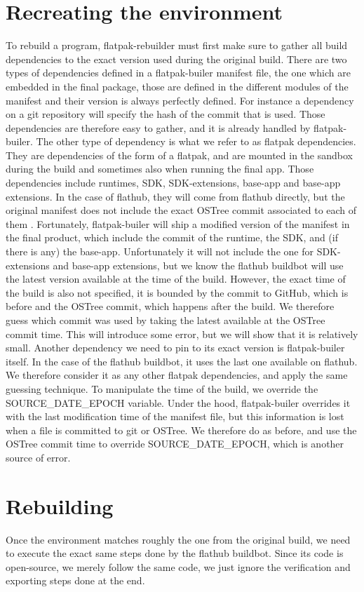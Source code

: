 \documentclass[a4paper,11pt,oneside]{report}
\theoremstyle{definition}
\newcommand{\sysname}{flatpak-rebuilder\xspace}
\newcommand{\fp}{flatpak\xspace}
\newcommand{\fh}{flathub\xspace}
\newcommand{\fb}{flatpak-builer\xspace}
\newcommand{\fdp}{flatpak dependencies\xspace}
\newcommand{\sde}{SOURCE\_DATE\_EPOCH\xspace}
\newcommand{\fhbb}{flathub buildbot\xspace}
\newcommand{\ot}{OSTree\xspace}
\begin{document}
\section{Recreating the environment}
To rebuild a program, \sysname must first make sure to gather all build
dependencies to the exact version used during the original build. There are two
types of dependencies defined in a \fb manifest file, the one which are
embedded in the final package, those are defined in the different modules of
the manifest and their version is always perfectly defined. For instance a
dependency on a git repository will specify the hash of the commit that is
used. Those dependencies are therefore easy to gather, and it is already
handled by \fb.
The other type of dependency is what we refer to as \fdp. They are dependencies
of the form of a \fp, and are mounted in the sandbox during the build and
sometimes also when running the final app. Those dependencies include runtimes,
SDK, SDK-extensions, base-app and base-app extensions. In the case of \fh, they
will come from \fh directly, but the original manifest does not include the
exact \ot commit associated to each of them . Fortunately, \fb will ship a
modified version of the manifest in the final product, which include the commit
of the runtime, the SDK, and (if there is any) the base-app. Unfortunately it
will not include the one for SDK-extensions and base-app extensions, but we
know the \fhbb will use the latest version available at the time of the build.
However, the exact time of the build is also not specified, it is bounded by
the commit to GitHub, which is before and the \ot commit, which happens
after the build. We therefore guess which commit was used by taking the latest
available at the \ot commit time. This will introduce some error, but we
will show that it is relatively small. Another dependency we need to
pin to its exact version is \fb itself. In the case of the \fhbb, it uses the
last one available on \fh. We therefore consider it as any other \fdp, and
apply the same guessing technique. 
To manipulate the time of the build, we override the \sde variable. Under the
hood, \fb overrides it with the last modification time of the manifest file,
but this information is lost when a file is committed to git or \ot . We
therefore do as before, and use the \ot commit time to override \sde, which
is another source of error.

\section{Rebuilding}
Once the environment matches roughly the one from the original build, we need
to execute the exact same steps done by the \fhbb. Since its code is
open-source, we merely follow the same code, we just ignore the verification
and exporting steps done at the end.
\end{document}
